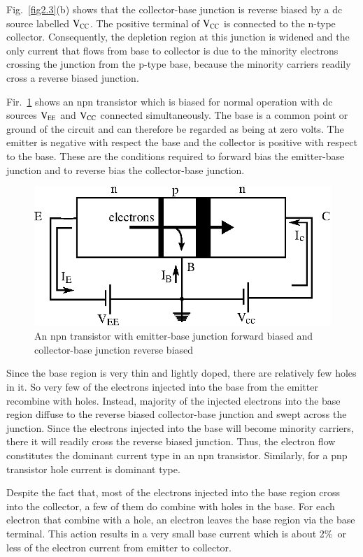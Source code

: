 Fig.~\ref{fig2.3}(b) shows that the collector-base junction is reverse biased by a dc source labelled $\textrm{V}_{\textrm{C}\textrm{C}}$. The positive terminal of $\textrm{V}_{\textrm{C}\textrm{C}}$ is connected to the n-type collector. Consequently, the depletion region at this junction is widened and the only current that flows from base to collector is due to the minority electrons crossing the junction from the p-type base, because the minority carriers readily cross a reverse biased junction.

Fir.~\ref{fig2.4} shows an npn transistor which is biased for normal operation with dc sources $\textrm{V}_{\textrm{E}\textrm{E}}$ and $\textrm{V}_{\textrm{C}\textrm{C}}$ connected simultaneously. The base is a common point or ground of the circuit and can therefore be regarded as being at zero volts. The emitter is negative with respect the base and the collector is positive with respect to the base. These are the conditions required to forward bias the emitter-base junction and to reverse bias the collector-base junction.
\begin{figure}[H]
\centering
\includegraphics[scale=.97]{chap2/fig4.eps}
\caption{An npn transistor with emitter-base junction forward biased and collector-base junction reverse biased}\label{fig2.4}
\end{figure}
Since the base region is very thin and lightly doped, there are relatively few holes in it. So very few of the electrons injected into the base from the emitter recombine with holes. Instead, majority of the injected electrons into the base region diffuse to the reverse biased collector-base junction and swept across the junction. Since the electrons injected into the base will become minority carriers, there it will readily cross the reverse biased junction. Thus, the electron flow constitutes the dominant current type in an npn transistor. Similarly, for a pnp transistor hole current is dominant type.

Despite the fact that, most of the electrons injected into the base region cross into the collector, a few of them do combine with holes in the base. For each electron that combine with a hole, an electron leaves the base region via the base terminal. This action results in a very small base current which is about 2\%\ or less of the electron current from emitter to collector.


